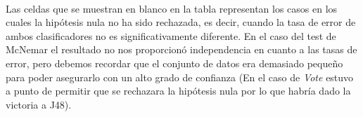 \documentclass[10pt, a4paper,spanish]{article}
\begin{document}
		\paragraph{}
		Las celdas que se muestran en blanco en la tabla representan los casos en los cuales la hipótesis nula no ha sido rechazada, es decir, cuando la tasa de error de ambos clasificadores no es significativamente diferente. En el caso del test de McNemar el resultado no nos proporcionó independencia en cuanto a las tasas de error, pero debemos recordar que el conjunto de datos era demasiado pequeño para poder asegurarlo con un alto grado de confianza (En el caso de \emph{Vote} estuvo a punto de permitir que se rechazara la hipótesis nula por lo que habría dado la victoria a J48).
\end{document}

